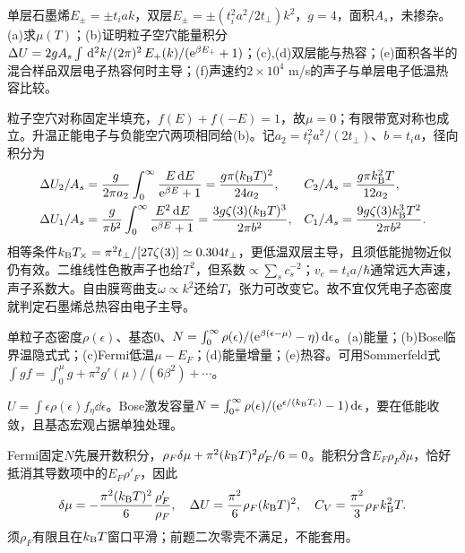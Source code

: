 \begin{exercise}[原题5(a)--(f)，选做]\label{p:333-6-5}
单层石墨烯$E_\pm=\pm t_iak$，双层$E_\pm=\pm(t_i^2a^2/2t_\perp)k^2$，$g=4$，面积$A_s$，未掺杂。(a)求$\mu(T)$；(b)证明粒子空穴能量积分$\Delta U=2gA_s\int\,\mathrm d^2k/(2\pi)^2\,E_+(k)/(\mathrm e^{\beta E_+}+1)$；(c),(d)双层能与热容；(e)面积各半的混合样品双层电子热容何时主导；(f)声速约$2\times10^4$ m/s的声子与单层电子低温热容比较。
\end{exercise}
\begin{solution}
粒子空穴对称固定半填充，$f(E)+f(-E)=1$，故$\mu=0$；有限带宽对称也成立。升温正能电子与负能空穴两项相同给(b)。记$a_2=t_i^2a^2/(2t_\perp)$、$b=t_ia$，径向积分为
\begin{align}
\Delta U_2/A_s&=\frac{g}{2\pi a_2}\int_0^\infty\frac{E\,\mathrm d E}{\mathrm e^{\beta E}+1}=\frac{g\pi(k_{\mathrm B} T)^2}{24a_2},&C_2/A_s&=\frac{g\pi k_{\mathrm B}^2T}{12a_2},\\
\Delta U_1/A_s&=\frac{g}{\pi b^2}\int_0^\infty\frac{E^2\,\mathrm d E}{\mathrm e^{\beta E}+1}=\frac{3g\zeta(3)(k_{\mathrm B} T)^3}{2\pi b^2},&C_1/A_s&=\frac{9g\zeta(3)k_{\mathrm B}^3T^2}{2\pi b^2}.
\end{align}
相等条件$k_{\mathrm B} T_\times=\pi^2t_\perp/[27\zeta(3)]\simeq0.304t_\perp$，更低温双层主导，且须低能抛物近似仍有效。二维线性色散声子也给$T^2$，但系数$\propto\sum_s c_s^{-2}$；$v_e=t_ia/\hbar$通常远大声速，声子系数大。自由膜弯曲支$\omega\propto k^2$还给$T$，张力可改变它。故不宜仅凭电子态密度就判定石墨烯总热容由电子主导。
\end{solution}
\begin{exercise}[原题6(a)--(e)]\label{p:333-6-6}
单粒子态密度$\rho(\epsilon)$、基态0、$N=\int_0^\infty\rho(\epsilon)/(\mathrm e^{\beta(\epsilon-\mu)}-\eta)\,\mathrm d\epsilon$。(a)能量；(b)Bose临界温隐式式；(c)Fermi低温$\mu-E_F$；(d)能量增量；(e)热容。可用Sommerfeld式$\int gf=\int_0^\mu g+\pi^2g'(\mu)/(6\beta^2)+\cdots$。
\end{exercise}
\begin{solution}
$U=\int\epsilon\rho(\epsilon)f_\eta\dd\epsilon$。Bose激发容量$N=\int_{0^+}^\infty\rho(\epsilon)/(\mathrm e^{\epsilon/(k_{\mathrm B} T_c)}-1)\,\mathrm d\epsilon$，要在低能收敛，且基态宏观占据单独处理。

Fermi固定$N$先展开数积分，$\rho_F\delta\mu+\pi^2(k_{\mathrm B} T)^2\rho'_F/6=0$。能积分含$E_F\rho_F\delta\mu$，恰好抵消其导数项中的$E_F\rho'_F$，因此
\begin{equation}
\delta\mu=-\frac{\pi^2(k_{\mathrm B} T)^2}{6}\frac{\rho'_F}{\rho_F},\quad
\Delta U=\frac{\pi^2}{6}\rho_F(k_{\mathrm B} T)^2,\quad C_V=\frac{\pi^2}{3}\rho_Fk_{\mathrm B}^2T.
\end{equation}
须$\rho_F$有限且在$k_{\mathrm B} T$窗口平滑；前题二次零壳不满足，不能套用。
\end{solution}
